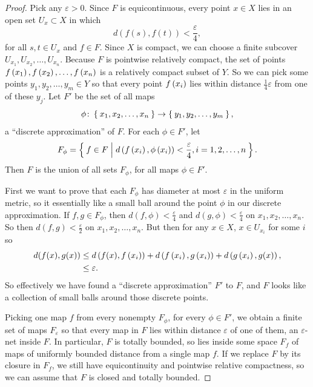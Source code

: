 \begin{proof}
Pick any \(\varepsilon > 0\). 
Since \(F\) is equicontinuous, every point \(x \in X\) lies in an open set \(U_x \subset X\) in which 
\[
d(f(s),f(t)) < \frac{\varepsilon}{4},
\]
for all \(s,t \in U_x\) and \(f \in F\).
Since \(X\) is compact, we can choose a finite subcover \(U_{x_1}, U_{x_2}, \dots, U_{x_n}\).
Because \(F\) is pointwise relatively compact, the set of points \(f\left(x_1\right), f\left(x_2\right), \dots, f\left(x_n\right)\) is a relatively compact subset of \(Y\).
So we can pick some points \(y_1, y_2, \dots, y_m \in Y\) so that every point \(f\left(x_i\right)\) lies within distance \(\frac{1}{4}\varepsilon\) from one of these \(y_j\).
Let \(F'\) be the set of all maps
\[
\phi \colon \Set{x_1, x_2, \dots, x_n} \to \Set{y_1, y_2, \dots, y_m},
\]
a ``discrete  approximation'' of \(F\).
For each \(\phi \in F'\), let  
\[
F_{\phi} = \Set{f \in F| d\ensuremath{\left(f\left(x_i\right),\phi\left(x_i\right)\right)} < \frac{\varepsilon}{4}, i=1,2,\dots,n}.
\]
Then \(F\) is the union of all sets \(F_{\phi}\), for all maps \(\phi \in F'\).

First we want to prove that each \(F_{\phi}\) has diameter at most \(\varepsilon\) in the uniform metric, so it essentially like a small ball around the point \(\phi\) in our discrete approximation.
If \(f, g \in F_{\phi}\), then \(d(f,\phi)<\frac{\varepsilon}{4}\) and \(d(g,\phi)<\frac{\varepsilon}{4}\) on \(x_1, x_2, \dots, x_n\).
So then \(d(f,g) < \frac{\varepsilon}{2}\) on \(x_1, x_2, \dots, x_n\).
But then for any \(x \in X\), \(x \in U_{x_i}\) for some \(i\) so
\begin{align*}
d(f(x),g(x)) 
&\le
d\left(f(x),f\left(x_i\right)\right) 
+
d\left(f\left(x_i\right),g\left(x_i\right)\right) 
+
d\left(g\left(x_i\right),g(x)\right),
\\
&\le 
\varepsilon.
\end{align*}
So effectively we have found a ``discrete approximation'' \(F'\) to  \(F\), and \(F\) looks like a collection of small balls around those discrete points.

Picking one map \(f\) from every nonempty \(F_{\phi}\), for every \(\phi \in F'\), we obtain a finite set of maps \(F_{\varepsilon}\) so that every map in \(F\) lies within distance \(\varepsilon\) of one of them, an \(\varepsilon\)-net inside \(F\).
In particular, \(F\) is totally bounded, so lies inside some space \(F_f\) of maps of uniformly bounded distance from a single map \(f\).
If we replace \(F\) by its closure in \(F_f\), we still have equicontinuity and pointwise relative compactness, so we can assume that \(F\) is closed and totally bounded.


\end{proof}
